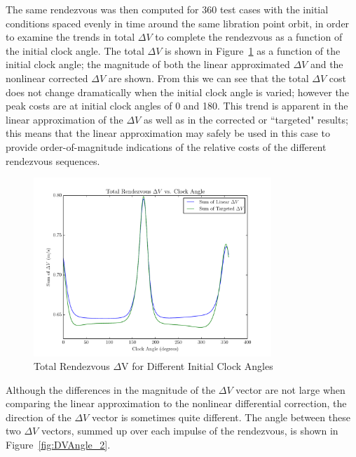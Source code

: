 \documentclass[letterpaper, preprint, paper,11pt]{AAS}	%
\begin{document}
The same rendezvous was then computed for 360 test cases with the initial conditions spaced evenly in time around the same libration point orbit, in order to examine the trends in total \(\Delta V\) to complete the rendezvous as a function of the initial clock angle. The total \(\Delta V\) is shown in Figure~\ref{fig:DV_2} as a function of the initial clock angle; the magnitude of both the linear approximated \(\Delta V\) and the nonlinear corrected \(\Delta V\) are shown.  From this we can see that the total \(\Delta V\) cost does not change dramatically when the initial clock angle is varied; however the peak costs are at initial clock angles of 0\textdegree \- and 180\textdegree.  This trend is apparent in the linear approximation of the \(\Delta V\) as well as in the corrected or ``targeted" results; this means that the linear approximation may safely be used in this case to provide order-of-magnitude indications of the relative costs of the different rendezvous sequences.

\begin{figure}[htb] 
	\begin{center}
		\includegraphics[width=0.8\textwidth]{Total_DV_2_1degsteps} 
		\caption{Total Rendezvous \(\Delta\)V for Different Initial Clock Angles}
		\label{fig:DV_2}
	\end{center}
\end{figure}

Although the differences in the magnitude of the \(\Delta V\) vector are not large when comparing the linear approximation to the nonlinear differential correction, the direction of the \(\Delta V\) vector is sometimes quite different. The angle between these two \(\Delta V\) vectors, summed up over each impulse of the rendezvous, is shown in Figure~\ref{fig:DVAngle_2}.
\end{document}
